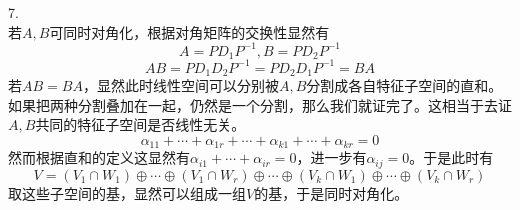 \documentclass[utf8]{ctexart}
\begin{document}
7.\\
若$A,B$可同时对角化，根据对角矩阵的交换性显然有
\[A=PD_1P^{-1},B=PD_2P^{-1}\]
\[AB=PD_1D_2P^{-1}=PD_2D_1P^{-1}=BA\]
若$AB=BA$，显然此时线性空间可以分别被$A,B$分割成各自特征子空间的直和。如果把两种分割叠加在一起，仍然是一个分割，那么我们就证完了。这相当于去证$A,B$共同的特征子空间是否线性无关。
\[\alpha_{11}+\cdots+\alpha_{1r}+\cdots+\alpha_{k1}+\cdots+\alpha_{kr}=0\]
然而根据直和的定义这显然有$\alpha_{i1}+\cdots+\alpha_{ir}=0$，进一步有$\alpha_{ij}=0$。于是此时有
\[V=(V_1\cap W_1)\oplus\cdots\oplus(V_1\cap W_r)\oplus\cdots\oplus(V_k\cap W_1)\oplus\cdots\oplus(V_k\cap W_r)\]
取这些子空间的基，显然可以组成一组$V$的基，于是同时对角化。
\end{document}
